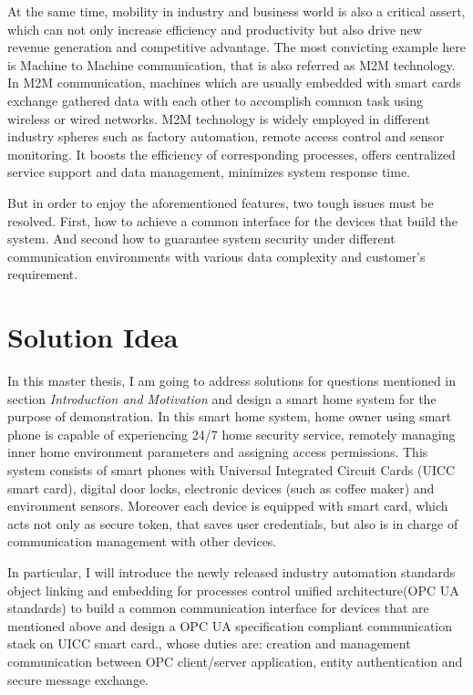 At the same time, mobility in industry and business world is also a critical  assert, which can not only increase efficiency and productivity but also drive new revenue generation and competitive advantage. The most convicting example here is Machine to Machine communication, that is also referred as M2M technology. In M2M communication, machines which are usually embedded with smart cards exchange gathered data with each other to accomplish common task using wireless or wired networks. M2M technology is widely employed in different industry spheres such as factory automation, remote access control and sensor monitoring. It boosts the efficiency of corresponding processes, offers centralized service support and data management, minimizes system response time.

But in order to enjoy the aforementioned features, two tough issues must be resolved. First, how to achieve a common interface for the devices that build the system.  And second how to guarantee system security under different communication environments with various data complexity and customer's requirement.

\section{Solution Idea}\label{secSolutionIdea}

In this master thesis, I am going to address solutions for questions mentioned in  section \emph{Introduction and Motivation} and  design a smart home system for the purpose of demonstration. In this smart home system, home owner using smart phone is capable of experiencing 24/7 home security service, remotely managing inner home environment parameters and assigning access permissions. This system consists of smart phones with Universal Integrated Circuit Cards (UICC  smart card), digital door locks, electronic devices (such as coffee maker) and environment sensors. Moreover each device is equipped with smart card, which acts not only as secure token, that saves  user credentials, but also is in charge of communication management with other devices.

In particular, I will introduce the newly released industry automation standards object linking and embedding for processes control unified architecture(OPC UA standards) to build a common communication interface for devices that are mentioned above and design a OPC UA specification compliant communication stack on UICC smart card., whose duties are: creation and management communication between OPC client/server application, entity authentication and secure message exchange.

